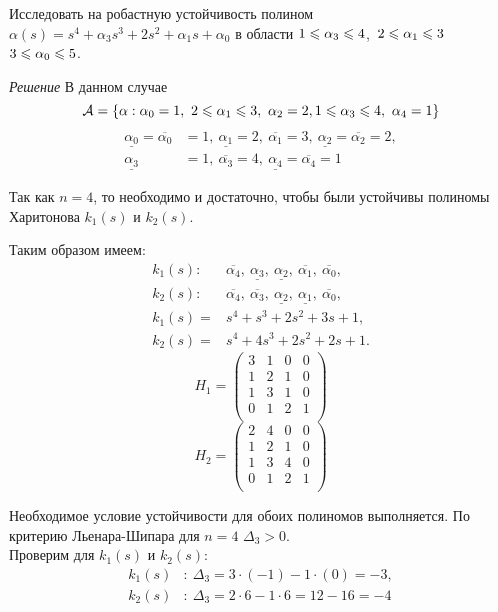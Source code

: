 \documentclass[../../TAU.tex]{subfiles}
\begin{document}
    \examp Исследовать на робастную устойчивость полином $\alpha(s) = s^4 + \alpha_3 s^3 + 2 s^2 + \alpha_1 s + \alpha_0$ в области $1\leqslant \alpha_3 \leqslant 4$,\ $ 2 \leqslant \alpha_1 \leqslant 3$ $3\leqslant \alpha_0\leqslant5$.

    {\it Решение}
    В данном случае 
    $$
        \IT{A} = \left\{\alpha: \alpha_0=1,\ 2\lse \alpha_1 \lse 3,\ \alpha_2 = 2, 1\lse \alpha_3\lse 4,\ \alpha_4=1\right\}
    $$
    \begin{align*}
        \underline{\alpha_0}=\overline{\alpha_0}&=1,\ 
        \underline{\alpha_1}=2,\ \overline{\alpha_1}=3,\
        \underline{\alpha_2}=\overline{\alpha_2}=2,\\
        \underline{\alpha_3}&=1,\ \overline{\alpha_3}=4,\ 
        \underline{\alpha_4}=\overline{\alpha_4}=1
    \end{align*}

    Так как $n=4$, то необходимо и достаточно, чтобы были устойчивы полиномы Харитонова 
    ${k}_1(s)$ и ${k}_2(s)$.

    Таким образом имеем:
    \begin{align*}
        {k}_1(s):\ &\overline{\alpha_4},\ \underline{\alpha_3},\ \underline{\alpha_2},\ \overline{\alpha_1},\ \overline{\alpha_0},\\
        {k}_2(s):\ &\overline{\alpha_4},\ \overline{\alpha_3},\ \underline{\alpha_2},\ \underline{\alpha_1},\ \overline{\alpha_0},\\
        {k}_1(s)= &s^4+s^3+2s^2+3s+1,\\
        {k}_2(s)= &s^4+4s^3+2s^2+2s+1.
    \end{align*}
    $$
        H_1=
        \begin{pmatrix}
            3 & 1 & 0 & 0 \\
            1 & 2 & 1 & 0 \\
            1 & 3 & 1 & 0 \\
            0 & 1 & 2 & 1 \\
        \end{pmatrix}
    $$
    $$
        H_2=
        \begin{pmatrix}
            2 & 4 & 0 & 0 \\
            1 & 2 & 1 & 0 \\
            1 & 3 & 4 & 0 \\
            0 & 1 & 2 & 1 \\
        \end{pmatrix}
    $$

    Необходимое условие устойчивости для обоих полиномов выполняется. По критерию Льенара-Шипара для $n=4$ $\Delta_3>0$.\\
    Проверим для ${k}_1(s)$ и ${k}_2(s)$:
    \begin{align*}
        {k}_1(s)&:\ \Delta_3=3\cdot(-1)-1\cdot(0)=-3,\\
        {k}_2(s)&:\ \Delta_3=2\cdot6-1\cdot6=12-16=-4
    \end{align*}
\end{document}
